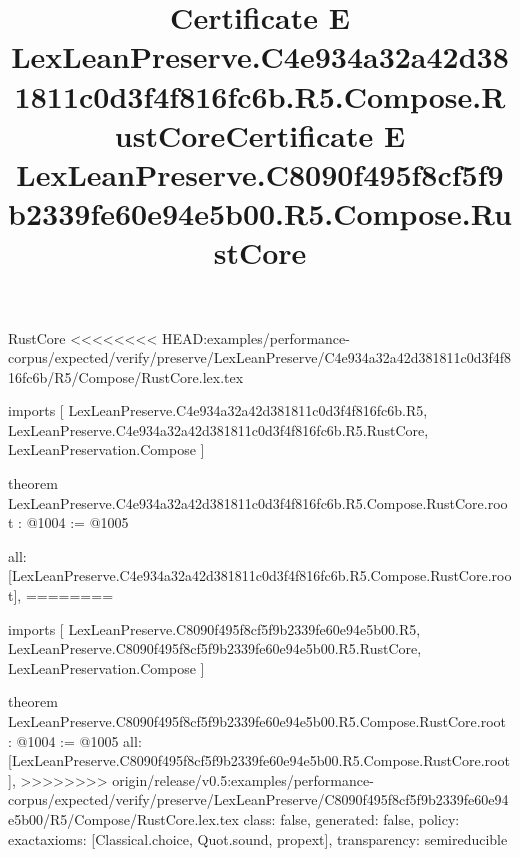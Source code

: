 \begin{lexlean}{RustCore}
<<<<<<<< HEAD:examples/performance-corpus/expected/verify/preserve/LexLeanPreserve/C4e934a32a42d381811c0d3f4f816fc6b/R5/Compose/RustCore.lex.tex
\title{Certificate E LexLeanPreserve.C4e934a32a42d381811c0d3f4f816fc6b.R5.Compose.RustCore}
\begin{coremodule}
imports [
  LexLeanPreserve.C4e934a32a42d381811c0d3f4f816fc6b.R5,
  LexLeanPreserve.C4e934a32a42d381811c0d3f4f816fc6b.R5.RustCore,
  LexLeanPreservation.Compose
]

theorem LexLeanPreserve.C4e934a32a42d381811c0d3f4f816fc6b.R5.Compose.RustCore.root : @1004 := @1005 {
  all: [LexLeanPreserve.C4e934a32a42d381811c0d3f4f816fc6b.R5.Compose.RustCore.root],
========
\title{Certificate E LexLeanPreserve.C8090f495f8cf5f9b2339fe60e94e5b00.R5.Compose.RustCore}
\begin{coremodule}
imports [
  LexLeanPreserve.C8090f495f8cf5f9b2339fe60e94e5b00.R5,
  LexLeanPreserve.C8090f495f8cf5f9b2339fe60e94e5b00.R5.RustCore,
  LexLeanPreservation.Compose
]

theorem LexLeanPreserve.C8090f495f8cf5f9b2339fe60e94e5b00.R5.Compose.RustCore.root : @1004 := @1005 {
  all: [LexLeanPreserve.C8090f495f8cf5f9b2339fe60e94e5b00.R5.Compose.RustCore.root],
>>>>>>>> origin/release/v0.5:examples/performance-corpus/expected/verify/preserve/LexLeanPreserve/C8090f495f8cf5f9b2339fe60e94e5b00/R5/Compose/RustCore.lex.tex
  class: false,
  generated: false,
  policy: exact{axioms: [Classical.choice, Quot.sound, propext]},
  transparency: semireducible
}


\end{coremodule}}
\end{coremodule}
\end{lexlean}
